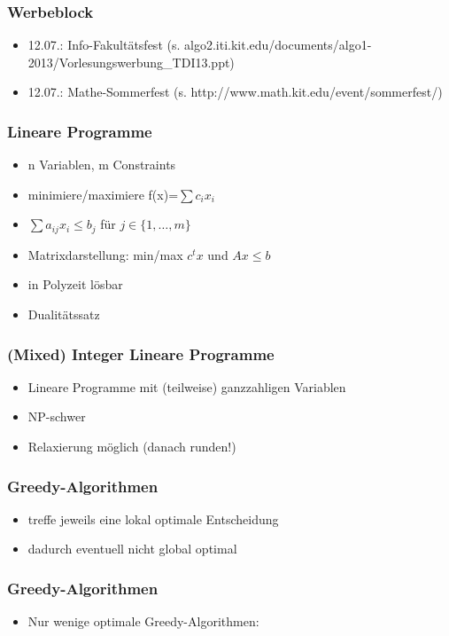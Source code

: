 

\begin{frame}
  \titlepage
\end{frame}

\begin{frame}
\frametitle{Werbeblock}
\begin{itemize}
\item 12.07.: Info-Fakultätsfest (s. algo2.iti.kit.edu/documents/algo1-2013/Vorlesungswerbung\_TDI13.ppt)
\item 12.07.: Mathe-Sommerfest (s. http://www.math.kit.edu/event/sommerfest/)
\end{itemize}
\end{frame}

\begin{frame}
\frametitle{Lineare Programme}
\begin{itemize}
\item n Variablen, m Constraints\pause
\item minimiere/maximiere f(x)=$\sum c_i x_i$
\item $\sum a_{ij} x_i \leq b_j$ für $j\in\{1,\ldots,m\}$\pause
\item Matrixdarstellung: min/max $c^t x$ und $A x\leq b$\pause
\item in Polyzeit lösbar\pause
\item Dualitätssatz
\end{itemize}
\end{frame}

\begin{frame}
\frametitle{(Mixed) Integer Lineare Programme}
\begin{itemize}
\item Lineare Programme mit (teilweise) ganzzahligen Variablen\pause
\item NP-schwer\pause
\item Relaxierung möglich (danach runden!)
\end{itemize}
\end{frame}

\begin{frame}
\frametitle{Greedy-Algorithmen}
\begin{itemize}
\item treffe jeweils eine lokal optimale Entscheidung
\item dadurch eventuell nicht global optimal
\end{itemize}
\end{frame}

\begin{frame}
\frametitle{Greedy-Algorithmen}
\begin{itemize}
\item Nur wenige optimale Greedy-Algorithmen: 
\end{itemize}
\end{frame}


